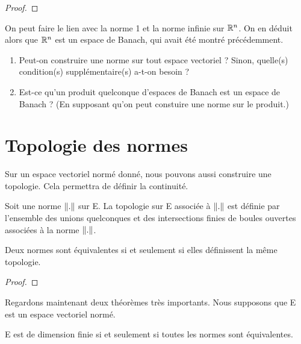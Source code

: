 \ifdefined\outputproof
\begin{proof}

\end{proof}
\fi

\begin{exemple}
	On peut faire le lien avec la norme 1 et la norme infinie sur
	$
\mathbb{R}^{n}$. On en déduit alors que $
\mathbb{R}^{n}$ est un espace de
	Banach, qui avait été montré précédemment.
\end{exemple}

\begin{question}
	\begin{enumerate}
		\item Peut-on construire une norme sur tout espace vectoriel ?
			Sinon, quelle(s) condition(s) supplémentaire(s) a-t-on besoin ?
		\item Est-ce qu'un produit quelconque d'espaces de Banach est un
			espace de Banach ? (En supposant qu'on peut constuire une norme
			sur le produit.)
	\end{enumerate}
\end{question}

\section{Topologie des normes}

Sur un espace vectoriel normé donné, nous pouvons aussi construire une
topologie. Cela permettra de définir la continuité.

\begin{definition}
	Soit une norme $\norm{.}$ sur E. La topologie sur E associée à $\norm{.}$
	est définie par l'ensemble des unions quelconques et des intersections
	finies de boules ouvertes associées à la norme $\norm{.}$.
\end{definition}

\begin{proposition}
	Deux normes sont équivalentes si et seulement si elles définissent la même topologie.
\end{proposition}

\ifdefined\outputproof
\begin{proof}

\end{proof}
\fi

Regardons maintenant deux théorèmes très importants. Nous supposons que E est un espace
vectoriel normé.

\begin{theorem}
	E est de dimension finie si et seulement si toutes les normes sont équivalentes.
\end{theorem}

